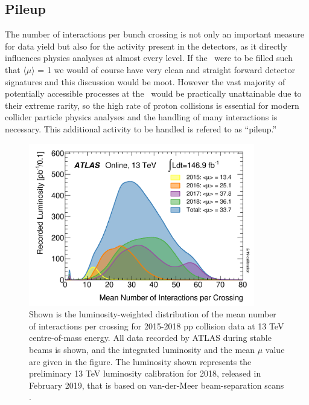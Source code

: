 \subsection{Pileup}\label{sec:detector:pileup}
The number of interactions per bunch crossing is not only an important measure for data yield but also for the activity present in the detectors, as it directly influences physics analyses at almost every level. 
If the \lhc\ were to be filled such that $\langle \mu \rangle$ = 1 we would of course have very clean and straight forward detector signatures and this discussion would be moot.
However the vast majority of potentially accessible processes at the \lhc\ would be practically unattainable due to their extreme rarity, so the high rate of proton collisions is essential for modern collider particle physics analyses and the handling of many interactions is necessary.
This additional activity to be handled is refered to as ``pileup.'' 
\begin{figure}[tbp]
  \begin{center}
    \includegraphics[width=0.88\textwidth]{figs/detector/pileupprofile.png}
  \end{center}
  \caption[The luminosity-weighted distribution of the mean number of interactions per crossing for 2015-2018 pp collision data at 13 TeV centre-of-mass energy.]
          {Shown is the luminosity-weighted distribution of the mean number of interactions per crossing for 2015-2018 pp collision data at 13 TeV centre-of-mass energy.
          All data recorded by ATLAS during stable beams is shown, and the integrated luminosity and the mean $\mu$ value are given in the figure.
          The luminosity shown represents the preliminary 13 TeV luminosity calibration for 2018, released in February 2019, that is based on van-der-Meer beam-separation scans \cite{MeanMuLuminosity}.}
  \label{fig:detector:pileupprofile}
\end{figure}
